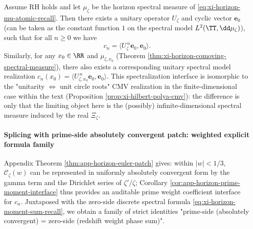 \begin{corollary}\label{cor:xi-horizon-unitary-spectral-realization}
Assume RH holds and let \(\mu_{\zeta}\) be the horizon spectral measure of \eqref{eq:xi-horizon-mu-atomic-recall}.
Then there exists a unitary operator \(U_{\zeta}\) and cyclic vector \(\mathbf{e}_0\) (can be taken as the constant function \(1\) on the spectral model \(L^2(\TT,\dd\mu_{\zeta})\)), such that for all \(n\ge 0\) we have
\begin{equation}\label{eq:xi-horizon-unitary-moments}
\boxed{\;
c_n=\langle U_{\zeta}^{\,n}\mathbf{e}_0,\mathbf{e}_0\rangle. \;}
\end{equation}
Similarly, for any \(x_0\in\RR\) and \(\mu_{\zeta,x_0}\) (Theorem \ref{thm:xi-horizon-comoving-spectral-measure}), there also exists a corresponding unitary spectral model realization \(c_n(x_0)=\langle U_{\zeta,x_0}^{\,n}\mathbf{e}_0,\mathbf{e}_0\rangle\).
This spectralization interface is isomorphic to the "unitarity \(\Leftrightarrow\) unit circle roots" CMV realization in the finite-dimensional case within the text (Proposition \ref{prop:xi-hilbert-polya-cmv}): the difference is only that the limiting object here is the (possibly) infinite-dimensional spectral measure induced by the real \(\Xi_{\zeta}\).
\end{corollary}

\paragraph{Splicing with prime-side absolutely convergent patch: weighted explicit formula family}
Appendix Theorem \ref{thm:app-horizon-euler-patch} gives: within \(|w|<1/3\), \(\mathscr{C}_{\zeta}(w)\) can be represented in uniformly absolutely convergent form by the gamma term and the Dirichlet series of \(\zeta'/\zeta\); Corollary \ref{cor:app-horizon-prime-moment-interface} thus provides an auditable prime weight coefficient interface for \(c_n\).
Juxtaposed with the zero-side discrete spectral formula \eqref{eq:xi-horizon-moment-sum-recall}, we obtain a family of strict identities "prime-side (absolutely convergent) = zero-side (redshift weight phase sum)".

